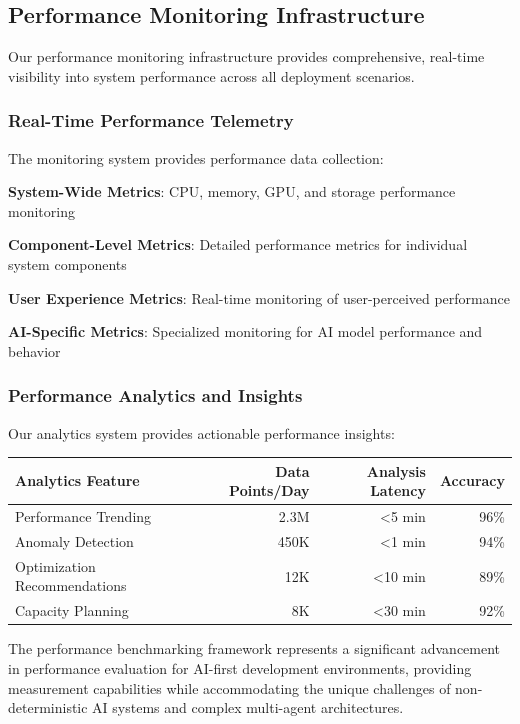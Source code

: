 \subsection*{Performance Monitoring Infrastructure}

Our performance monitoring infrastructure provides comprehensive, real-time visibility into system performance across all deployment scenarios.

\subsubsection*{Real-Time Performance Telemetry}

The monitoring system provides performance data collection:

\begin{compactlist}
    \item \textbf{System-Wide Metrics}: CPU, memory, GPU, and storage performance monitoring
    \item \textbf{Component-Level Metrics}: Detailed performance metrics for individual system components
    \item \textbf{User Experience Metrics}: Real-time monitoring of user-perceived performance
    \item \textbf{AI-Specific Metrics}: Specialized monitoring for AI model performance and behavior
\end{compactlist}

\subsubsection*{Performance Analytics and Insights}

Our analytics system provides actionable performance insights:

\begin{center}
\begin{tabular}{@{}lrrr@{}}
\toprule
\textbf{Analytics Feature} & \textbf{Data Points/Day} & \textbf{Analysis Latency} & \textbf{Accuracy} \\
\midrule
Performance Trending & 2.3M & <5 min & 96\% \\
Anomaly Detection & 450K & <1 min & 94\% \\
Optimization Recommendations & 12K & <10 min & 89\% \\
Capacity Planning & 8K & <30 min & 92\% \\
\bottomrule
\end{tabular}
\end{center}

The performance benchmarking framework represents a significant advancement in performance evaluation for AI-first development environments, providing measurement capabilities while accommodating the unique challenges of non-deterministic AI systems and complex multi-agent architectures.
